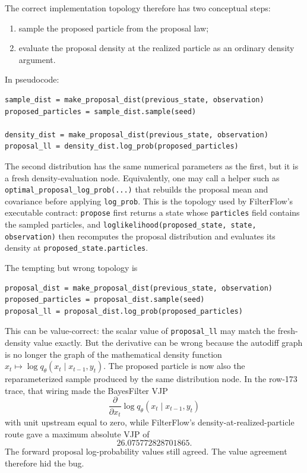 The correct implementation topology therefore has two conceptual steps:
\begin{enumerate}[label=(\roman*)]
  \item sample the proposed particle from the proposal law;
  \item evaluate the proposal density at the realized particle as an ordinary
    density argument.
\end{enumerate}
In pseudocode:
\begin{verbatim}
sample_dist = make_proposal_dist(previous_state, observation)
proposed_particles = sample_dist.sample(seed)

density_dist = make_proposal_dist(previous_state, observation)
proposal_ll = density_dist.log_prob(proposed_particles)
\end{verbatim}
The second distribution has the same numerical parameters as the first, but it
is a fresh density-evaluation node.  Equivalently, one may call a helper such
as \texttt{optimal\_proposal\_log\_prob(...)} that rebuilds the proposal mean
and covariance before applying \texttt{log\_prob}.  This is the topology used
by FilterFlow's executable contract: \texttt{propose} first returns a state
whose \texttt{particles} field contains the sampled particles, and
\texttt{loglikelihood(proposed\_state, state, observation)} then recomputes
the proposal distribution and evaluates its density at
\texttt{proposed\_state.particles}.

The tempting but wrong topology is
\begin{verbatim}
proposal_dist = make_proposal_dist(previous_state, observation)
proposed_particles = proposal_dist.sample(seed)
proposal_ll = proposal_dist.log_prob(proposed_particles)
\end{verbatim}
This can be value-correct: the scalar value of \texttt{proposal\_ll} may match
the fresh-density value exactly.  But the derivative can be wrong because the
autodiff graph is no longer the graph of the mathematical density function
$x_t\mapsto \log q_\theta(x_t\mid x_{t-1},y_t)$.  The proposed particle is now
also the reparameterized sample produced by the same distribution node.  In the
row-173 trace, that wiring made the BayesFilter VJP
\[
  \frac{\partial}{\partial x_t}\log q_\theta(x_t\mid x_{t-1},y_t)
\]
with unit upstream equal to zero, while FilterFlow's density-at-realized-particle
route gave a maximum absolute VJP of
\[
  26.075772828701865 .
\]
The forward proposal log-probability values still agreed.  The value agreement
therefore hid the bug.

